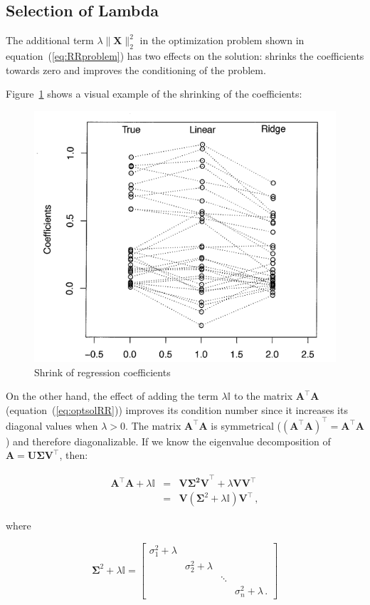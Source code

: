 \subsection{Selection of Lambda}

The additional term $\lambda \|\mathbf{\mathbf{X}}\|_2^2$ in the optimization
problem shown in equation~(\ref{eq:RRproblem}) has two effects on the solution:
shrinks the coefficients towards zero and improves the conditioning of the
problem.

Figure~\ref{fig:shrinks} shows a visual example of the shrinking of the
coefficients:

\begin{figure}[h!]
\includegraphics[width=0.5\linewidth]{img/shrinks}
\caption{Shrink of regression coefficients}
\label{fig:shrinks}
\end{figure}


On the other hand, the effect of adding the term $\lambda \mathbb{I}$
to the matrix $\mathbf{A}^\top \mathbf{A}$
(equation~(\ref{eq:optsolRR})) improves its condition number since it
increases its diagonal values when $\lambda > 0 $.  The matrix
$\mathbf{A}^\top \mathbf{A}$ is symmetrical ($(\mathbf{A}^\top
\mathbf{A})^\top = \mathbf{A}^\top \mathbf{A}$) and therefore
diagonalizable.  If we know the eigenvalue decomposition of $\mathbf{A}
= \mathbf{U\Sigma V^\top}$, then:

\begin{eqnarray*}
\mathbf{A}^\top \mathbf{A}+\lambda \mathbb{I}&=&\mathbf{V\Sigma^2
V}^\top + \lambda \mathbf{V} \mathbf{V}^\top\\ &=&\mathbf{V}
(\mathbf{\Sigma}^2+\lambda\mathbb{I}) \mathbf{V}^\top \, ,
\end{eqnarray*}

\noindent where

\begin{equation*}
\mathbf{\Sigma}^2+\lambda\mathbb{I}=
\begin{bmatrix}
\sigma^2_1 + \lambda & \, & \, \\
\, & \sigma^2_2 +\lambda & \, \\
\, & \, & \ddots & \, \\
\, & \, & \, & \sigma^2_n +\lambda \, .
\end{bmatrix}
\end{equation*}

